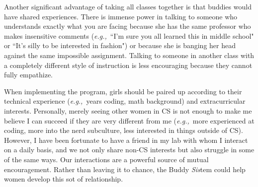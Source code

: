 \documentclass{article}
\newcommand{\eg}{{\em e.g.,}~}
\begin{document}
Another significant advantage of taking all classes together is that buddies would have shared experiences.
There is immense power in talking to someone who understands exactly what you are facing because she has the same professor who makes insensitive comments (\eg ``I'm sure you all learned this in middle school" or ``It's silly to be interested in fashion") or because she is banging her head against the same impossible assignment.
Talking to someone in another class with a completely different style of instruction is less encouraging because they cannot fully empathize.


When implementing the program, girls should be paired up according to their technical experience (\eg years coding, math background) and extracurricular interests.
Personally, merely seeing other women in CS is not enough to make me believe I can succeed if they are very different from me (\eg more experienced at coding, more into the nerd subculture, less interested in things outside of CS).
However, I have been fortunate to have a friend in my lab with whom I interact on a daily basis, and we not only share non-CS interests but also struggle in some of the same ways.
Our interactions are a powerful source of mutual encouragement.
Rather than leaving it to chance, the Buddy \textit{Sis}tem could help women develop this sot of relationship.
\end{document}
